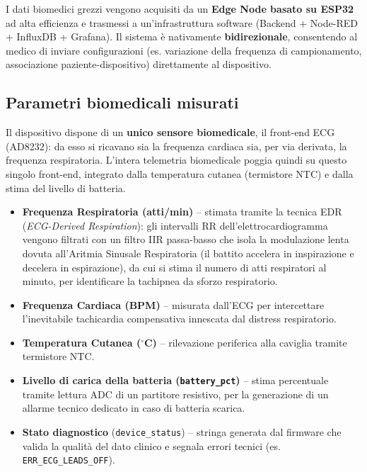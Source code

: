 \documentclass[11pt,a4paper]{article}
\begin{document}
I dati biomedici grezzi vengono acquisiti da un \textbf{Edge Node basato su ESP32} ad alta efficienza e trasmessi a un'infrastruttura software (Backend + Node-RED + InfluxDB + Grafana). Il sistema è nativamente \textbf{bidirezionale}, consentendo al medico di inviare configurazioni (es. variazione della frequenza di campionamento, associazione paziente-dispositivo) direttamente al dispositivo.

\subsection{Parametri biomedicali misurati}

Il dispositivo dispone di un \textbf{unico sensore biomedicale}, il front-end ECG (AD8232): da esso si ricavano sia la frequenza cardiaca sia, per via derivata, la frequenza respiratoria. L'intera telemetria biomedicale poggia quindi su questo singolo front-end, integrato dalla temperatura cutanea (termistore NTC) e dalla stima del livello di batteria.

\begin{itemize}[leftmargin=1.3em,itemsep=2pt]
  \item \textbf{Frequenza Respiratoria (atti/min)} -- stimata tramite la tecnica EDR (\emph{ECG-Derived Respiration}): gli intervalli RR dell'elettrocardiogramma vengono filtrati con un filtro IIR passa-basso che isola la modulazione lenta dovuta all'Aritmia Sinusale Respiratoria (il battito accelera in inspirazione e decelera in espirazione), da cui si stima il numero di atti respiratori al minuto, per identificare la tachipnea da sforzo respiratorio.
  \item \textbf{Frequenza Cardiaca (BPM)} -- misurata dall'ECG per intercettare l'inevitabile tachicardia compensativa innescata dal distress respiratorio.
  \item \textbf{Temperatura Cutanea ($^\circ$C)} -- rilevazione periferica alla caviglia tramite termistore NTC.
  \item \textbf{Livello di carica della batteria (\texttt{battery\_pct})} -- stima percentuale tramite lettura ADC di un partitore resistivo, per la generazione di un allarme tecnico dedicato in caso di batteria scarica.
  \item \textbf{Stato diagnostico} (\texttt{device\_status}) -- stringa generata dal firmware che valida la qualità del dato clinico e segnala errori tecnici (es. \texttt{ERR\_ECG\_LEADS\_OFF}).
\end{itemize}
\end{document}
